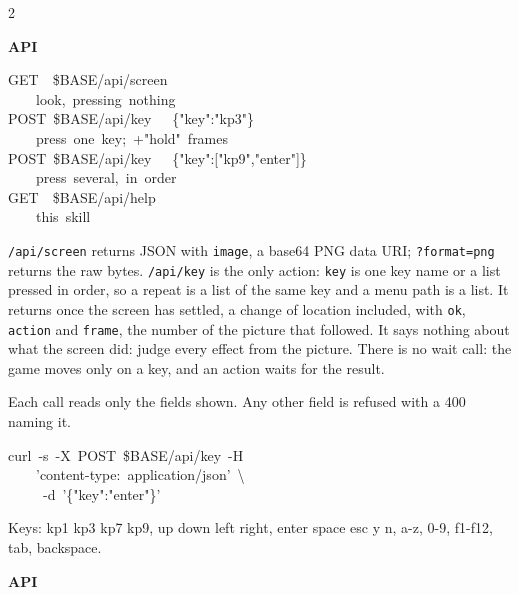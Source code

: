 \begin{paracol}{2}
{\footnotesize\bfseries API\par}
{\ttfamily\scriptsize\raggedright\noindent GET\ \ \$BASE/api/screen\ \ \ \ \ \ \ \ \ \ \ \ \ \ \ \ \ \ \ \ \ \ \ \\\ \ \ \ look,\ pressing\ nothing\\POST\ \$BASE/api/key\ \ \ \{"key":"kp3"\}\ \ \ \ \ \ \ \ \ \ \\\ \ \ \ press\ one\ key;\ +"hold"\ frames\\POST\ \$BASE/api/key\ \ \ \{"key":["kp9","enter"]\}\\\ \ \ \ press\ several,\ in\ order\\GET\ \ \$BASE/api/help\ \ \ \ \ \ \ \ \ \ \ \ \ \ \ \ \ \ \ \ \ \ \ \ \ \\\ \ \ \ this\ skill\par}
\texttt{/api/screen} returns JSON with \texttt{image}, a base64 PNG data URI; \texttt{?format=png} returns the raw bytes. \texttt{/api/key} is the only action: \texttt{key} is one key name or a list pressed in order, so a repeat is a list of the same key and a menu path is a list. It returns once the screen has settled, a change of location included, with \texttt{ok}, \texttt{action} and \texttt{frame}, the number of the picture that followed. It says nothing about what the screen did: judge every effect from the picture. There is no wait call: the game moves only on a key, and an action waits for the result.\par
Each call reads only the fields shown. Any other field is refused with a 400 naming it.\par
{\ttfamily\scriptsize\raggedright\noindent curl\ -s\ -X\ POST\ \$BASE/api/key\ -H\\\ \ \ \ 'content-type:\ application/json'\ \textbackslash{}\\\ \ \ \ \ -d\ '\{"key":"enter"\}'\par}
Keys: kp1 kp3 kp7 kp9, up down left right, enter space esc y n, a-z, 0-9, f1-f12, tab, backspace.\par
\switchcolumn
\footnotesize\setlength{\parskip}{2pt}
{\footnotesize\bfseries API\par}

\end{paracol}
